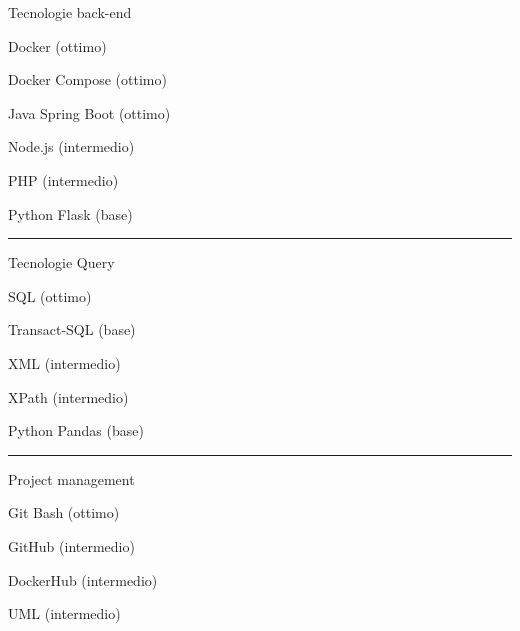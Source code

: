 \documentclass[a4paper]{letter}
\begin{document}
\begin{minipage}[t]{0.30\textwidth}
{\large Tecnologie back-end}

\faCode \quad Docker (ottimo)

\faCode \quad Docker Compose (ottimo)

\faCode \quad Java Spring Boot (ottimo)

\faCode \quad Node.js (intermedio)

\faCode \quad PHP (intermedio)

\faCode \quad Python Flask (base)

\rule{\linewidth}{0.4pt}


{\large Tecnologie Query}

\faCode \quad SQL (ottimo)

\faCode \quad Transact-SQL (base)

\faCode \quad XML (intermedio)

\faCode \quad XPath (intermedio)

\faCode \quad Python Pandas (base)

\rule{\linewidth}{0.4pt}

{\large Project management}

\faCode \quad Git Bash (ottimo)

\faCode \quad GitHub (intermedio)

\faCode \quad DockerHub (intermedio)

\faCode \quad UML (intermedio)



\end{minipage}
\hfill
\end{document}
